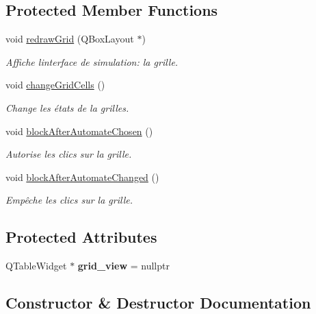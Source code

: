 \subsection*{Protected Member Functions}
\begin{DoxyCompactItemize}
\item 
void \mbox{\hyperlink{class_interface2_d_ac6472a84605f28bb34bff02850ac8414}{redraw\+Grid}} (Q\+Box\+Layout $\ast$)
\begin{DoxyCompactList}\small\item\em Affiche l\textquotesingle{}interface de simulation\+: la grille. \end{DoxyCompactList}\item 
\mbox{\label{class_interface2_d_a5db4a04ba08605e06b682c3503f9260e}} 
void \mbox{\hyperlink{class_interface2_d_a5db4a04ba08605e06b682c3503f9260e}{change\+Grid\+Cells}} ()
\begin{DoxyCompactList}\small\item\em Change les états de la grilles. \end{DoxyCompactList}\item 
void \mbox{\hyperlink{class_interface2_d_a44b18f9f41e84e09037e60e0163b801d}{block\+After\+Automate\+Chosen}} ()
\begin{DoxyCompactList}\small\item\em Autorise les clics sur la grille. \end{DoxyCompactList}\item 
void \mbox{\hyperlink{class_interface2_d_ab20f92429f8ce70f149a465b3f6b48c4}{block\+After\+Automate\+Changed}} ()
\begin{DoxyCompactList}\small\item\em Empêche les clics sur la grille. \end{DoxyCompactList}\end{DoxyCompactItemize}
\subsection*{Protected Attributes}
\begin{DoxyCompactItemize}
\item 
\mbox{\label{class_interface2_d_a5936664e8e4469ce700b6e3692057dc2}} 
Q\+Table\+Widget $\ast$ {\bfseries grid\+\_\+view} = nullptr
\end{DoxyCompactItemize}


\subsection{Constructor \& Destructor Documentation}
\mbox{\label{class_interface2_d_a8a7b688756ef687fd15059a526278170}} 

